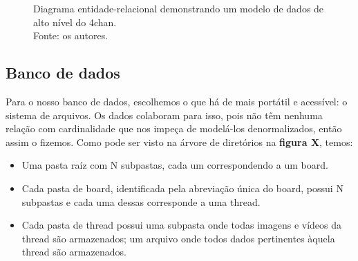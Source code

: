 \begin{figure}
    \centering
    \caption{
        Diagrama entidade-relacional demonstrando um modelo de dados de alto nível do 4chan.\\
        Fonte: os autores.
    }
    \label{fig:er-4chan}
\end{figure}

\subsection{Banco de dados}

Para o nosso banco de dados, escolhemos o que há de mais portátil e acessível: o sistema de arquivos.
Os dados colaboram para isso, pois não têm nenhuma relação com cardinalidade que nos impeça de modelá-los denormalizados, então assim o fizemos. Como pode ser visto na árvore de diretórios na \textbf{figura X}, temos:

\begin{itemize}
    \item Uma pasta raíz com N subpastas, cada um correspondendo a um board.
    \item Cada pasta de board, identificada pela abreviação única do board, possui N subpastas e cada uma dessas corresponde a uma thread.
    \item Cada pasta de thread possui 
        \subitem uma subpasta  onde todas imagens e vídeos da thread são armazenados;
        \subitem um arquivo  onde todos dados pertinentes àquela thread são armazenados.
\end{itemize}


